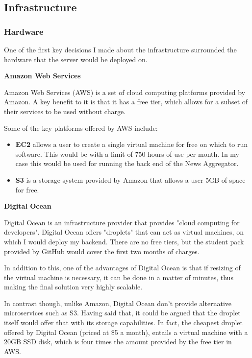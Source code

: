 \documentclass[12pt]{article}
\begin{document}
\subsection{Infrastructure}

\subsubsection{Hardware}

One of the first key decisions I made about the infrastructure surrounded the hardware that the server would be deployed on.

\textbf{Amazon Web Services}

Amazon Web Services (AWS) is a set of cloud computing platforms provided by Amazon. A key benefit to it is that it has a free tier, which allows for a subset of their services to be used without charge.

Some of the key platforms offered by AWS include: \\

\begin{itemize}
	\item \textbf{EC2} allows a user to create a single virtual machine for free on which to run software. This would be with a limit of 750 hours of use per month. In my case this would be used for running the back end of the News Aggregator. 
	\item \textbf{S3} is a storage system provided by Amazon that allows a user 5GB of space for free. \\
\end{itemize} 

\textbf{Digital Ocean}

Digital Ocean is an infrastructure provider that provides "cloud computing for developers". Digital Ocean offers "droplets" that can act as virtual machines, on which I would deploy my backend. There are no free tiers, but the student pack provided by GitHub would cover the first two months of charges. 

In addition to this, one of the advantages of Digital Ocean is that if resizing of the virtual machine is necessary, it can be done in a matter of minutes, thus making the final solution very highly scalable.

In contrast though, unlike Amazon, Digital Ocean don't provide alternative microservices such as S3. Having said that, it could be argued that the droplet itself would offer that with its storage capabilities. In fact, the cheapest droplet offered by Digital Ocean (priced at \$5 a month), entails a virtual machine with a 20GB SSD disk, which is four times the amount provided by the free tier in AWS.
\end{document}
